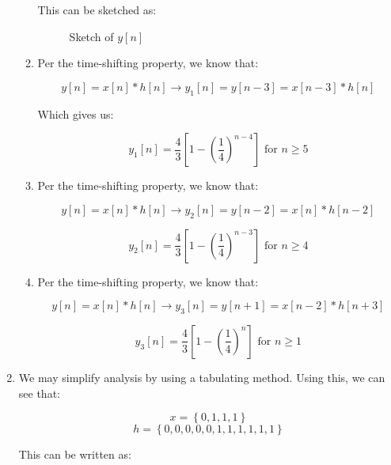 \begin{enumerate}
\begin{enumerate}
        This can be sketched as:

        \begin{figure}[H]
          \centering
          
          \caption{Sketch of $y[n]$}
          \label{fig:1}
        \end{figure}

      \item 

        Per the time-shifting property, we know that:

        $$y[n]=x[n]*h[n]\to y_1[n]=y[n-3]=x[n-3]*h[n]$$

        Which gives us:

        $$\boxed{y_1[n]=\frac{4}{3}\left[ 1-\left( \frac{1}{4} \right)^{n-4} \right]\text{ for }n\geq 5}$$

      \item 

        Per the time-shifting property, we know that:

        $$y[n]=x[n]*h[n]\to y_2[n]=y[n-2]=x[n]*h[n-2]$$

        $$\boxed{y_2[n]=\frac{4}{3}\left[ 1-\left( \frac{1}{4} \right)^{n-3} \right]\text{ for }n\geq 4}$$

      \item 

        Per the time-shifting property, we know that:

        $$y[n]=x[n]*h[n]\to y_3[n]=y[n+1]=x[n-2]*h[n+3]$$

        $$\boxed{y_3[n]=\frac{4}{3}\left[ 1-\left( \frac{1}{4} \right)^{n} \right]\text{ for }n\geq 1}$$

    \end{enumerate}

  \item

    We may simplify analysis by using a tabulating method. Using this, we can see that:

    $$x=\left\{ 0, 1, 1, 1 \right\}$$
    $$h=\left\{ 0, 0, 0, 0, 0, 1, 1, 1, 1, 1, 1 \right\}$$

    This can be written as:


\end{enumerate}
